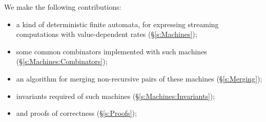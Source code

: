 We make the following contributions:
\begin{itemize}
\item a kind of deterministic finite automata, for expressing streaming computations with value-dependent rates (\S\ref{s:Machines});
\item some common combinators implemented with such machines (\S\ref{s:Machines:Combinators});
\item an algorithm for merging non-recursive pairs of these machines (\S\ref{s:Merging});
\item invariants required of such machines (\S\ref{s:Machines:Invariants});
\item and proofs of correctness (\S\ref{s:Proofs});
\end{itemize}


\newpage
